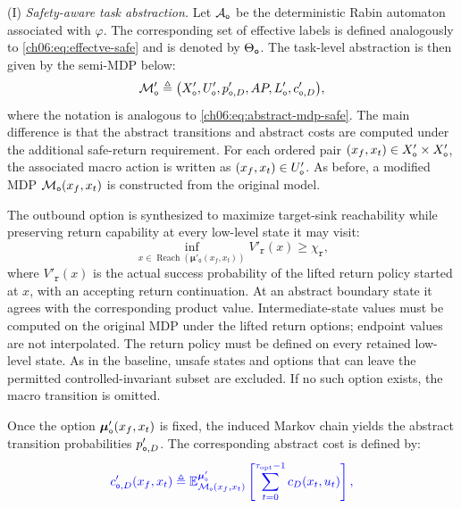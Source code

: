 (I) \emph{Safety-aware task abstraction.}
Let
\(\mathcal{A}_{\textup{\texttt{o}}}\) be the deterministic Rabin automaton
associated with \(\varphi\). The corresponding set of effective labels is
defined analogously to \eqref{ch06:eq:effectve-safe} and is denoted by
\(\Theta_{\textup{\texttt{o}}}\). The task-level abstraction is then given by
the semi-MDP below:
\begin{equation}
\label{ch06:eq:abstract-mdp-task}
\mathcal{M}'_{\textup{\texttt{o}}} \triangleq
\bigl(
X'_{\textup{\texttt{o}}},
U'_{\textup{\texttt{o}}},
p'_{\textup{\texttt{o}},D},
AP,
L'_{\textup{\texttt{o}}},
c'_{\textup{\texttt{o}},D}
\bigr),
\end{equation}
where the notation is analogous to
\eqref{ch06:eq:abstract-mdp-safe}. The main difference is that the abstract
transitions and abstract costs are computed under the additional safe-return
requirement.
For each ordered pair
\((x_f,x_t) \in
X'_{\textup{\texttt{o}}} \times X'_{\textup{\texttt{o}}}\), the associated
macro action is written as
\((x_f,x_t) \in U'_{\textup{\texttt{o}}}\). As before, a modified MDP
\(\mathcal{M}_{\textup{\texttt{o}}}(x_f,x_t)\) is constructed from the
original model. \begin{revision}
The outbound option is synthesized to maximize target-sink reachability
while preserving return capability at every low-level state it may visit:
\begin{equation}
\label{ch06:eq:abstract-task-lp}
\inf_{x\in\operatorname{Reach}(
\boldsymbol\mu'_{\texttt o}(x_f,x_t))}V'_{\texttt r}(x)
\ge\chi_{\texttt r},
\end{equation}
where $V'_{\texttt r}(x)$ is the actual success probability of the lifted
return policy started at $x$, with an accepting return continuation.
At an abstract boundary state it agrees with the corresponding product
value. Intermediate-state values must be computed on the original MDP
under the lifted return options; endpoint values are not interpolated.
The return policy must be defined on every retained low-level state.
As in the baseline, unsafe states and options that can leave the permitted
controlled-invariant subset are excluded. If no such option exists, the
macro transition is omitted.
\end{revision}
Once the option
\(\boldsymbol{\mu}'_{\textup{\texttt{o}}}(x_f,x_t)\) is fixed, the induced
Markov chain yields the abstract transition probabilities
\(p'_{\textup{\texttt{o}},D}\). The corresponding abstract cost is defined by:
\begin{equation}
\color{blue}
\label{ch06:eq:task-edge-cost}
c'_{\textup{\texttt{o}},D}(x_f,x_t) \triangleq
\mathbb{E}_{\mathcal{M}_{\textup{\texttt{o}}}(x_f,x_t)}^{
\boldsymbol{\mu}'_{\textup{\texttt{o}}}}
\left[
\sum_{t=0}^{\tau_{\mathrm{opt}}-1}
c_D(x_t,u_t)
\right],
\end{equation}
